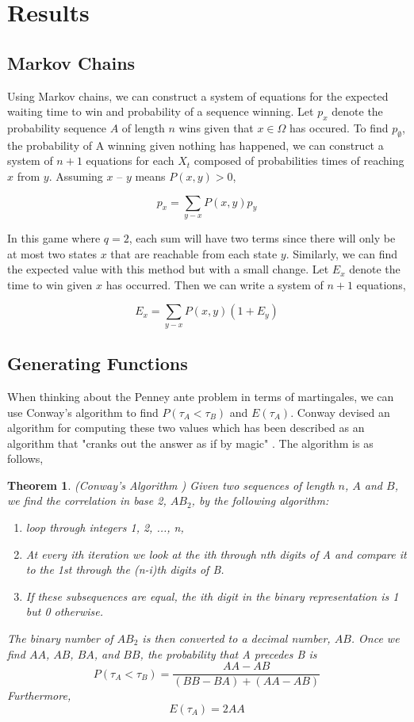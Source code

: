 \documentclass{article}
\newtheorem{theorem}{Theorem}[section]
\numberwithin{mytheorem}{subsection} %
\begin{document}
	\section{Results}
		\subsection{Markov Chains}
			Using Markov chains, we can construct a system of equations for the expected waiting time to win and probability of a sequence winning. Let $p_{x}$ denote the probability sequence $A$ of length $n$ wins given that $x\in\Omega$ has occured. To find $p_\emptyset$, the probability of A winning given nothing has happened, we can construct a system of $n+1$ equations for each $X_t$ composed of probabilities times of reaching $x$ from $y$. Assuming $x$ -- $y$ means $P(x,y) > 0$,

			$$p_x = \sum_{y - x} P(x,y) p_y$$

			In this game where $q=2$, each sum will have two terms since there will only be at most two states $x$ that are reachable from each state $y$. Similarly, we can find the expected value with this method but with a small change. Let $E_x$ denote the time to win given $x$ has occurred. Then we can write a system of $n+1$ equations,

			$$E_x = \sum_{y - x} P(x,y) (1 + E_y)$$


		\subsection{Generating Functions}
			When thinking about the Penney ante problem in terms of martingales, we can use Conway's algorithm to find $P(\tau_A < \tau_B)$ and $E(\tau_A)$. Conway devised an algorithm for computing these two values which has been described as an algorithm that "cranks out the answer as if by magic" \cite{gardner}. The algorithm is as follows,

			\begin{theorem}(Conway's Algorithm \cite{gardner})
			Given two sequences of length $n$, $A$ and $B$, we find the correlation in base 2, $AB_2$, by the following algorithm:
			\begin{enumerate}
			\item loop through integers 1, 2, ..., n,
			\item At every ith iteration we look at the ith through nth digits of A and compare
			   it to the 1st through the (n-i)th digits of B.
			\item If these subsequences are equal, the ith digit in the binary representation is 1 but 0 otherwise.
			\end{enumerate} 

			The binary number of $AB_2$
			is then converted to a decimal number, $AB$. Once we find $AA$, $AB$,
			$BA$, and $BB$, the probability that A precedes B is
			$$P(\tau_A < \tau_B) = \frac{AA - AB}{(BB - BA) + (AA - AB)} $$
			Furthermore, 
			$$E(\tau_A) = 2AA $$ 
			\end{theorem}
\end{document}

